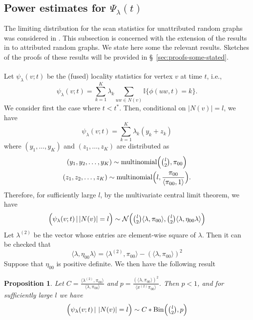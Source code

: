 \documentclass[draftcls]{IEEEtran}
\newtheorem{proposition}[theorem]{Proposition}
\theoremstyle{definition}
\begin{document}
\subsection{Power estimates for $\Psi_{\lambda}(t)$}
The limiting distribution for the scan statistics for unattributed
random graphs was considered in
\cite{rukhin:_limit_distr_graph_scan_statis}. This subsection is
concerned with the extension of the results in
\cite{rukhin:_limit_distr_graph_scan_statis} to attributed random
graphs. We state here some the relevant results. Sketches of the
proofs of these results will be provided in
\S~\ref{sec:proofs-some-stated}. \\ \\
\noindent
Let $\psi_{\lambda}(v;t)$ be the (fused) locality statistics for
vertex $v$ at time $t$, i.e.,
\begin{equation}
  \label{eq:11}
  \psi_{\lambda}(v;t) = \sum_{k=1}^{K} \lambda_k \sum_{uw \in N(v)}
  \mathbb{I}\{\phi(uw,t) = k\}.
\end{equation}
We consider first the case where $t < t^{*}$. Then, conditional on
$|N(v)| = l$, we have
\begin{equation*}
  \psi_{\lambda}(v;t) = \sum_{k=1}^{K}{\lambda_k (y_k + z_k)}
\end{equation*}
where $(y_1, \dots, y_K)$ and $(z_1, \dots, z_K)$ are distributed as
\begin{gather*}
  (y_1,y_2,\dots,y_K) \sim \textrm{multinomial}\Bigl(
  \tbinom{l}{2}, \pi_{00}\Bigr) \\ (z_1, z_2, \dots, z_K) \sim
  \textrm{multinomial}\Bigl(l, \frac{\pi_{00}}{\langle \pi_{00},
    1\rangle}\Bigr). 
\end{gather*}
Therefore, for sufficiently large $l$, by the multivariate central
limit theorem, we have
\begin{equation*}
  \Bigl(\psi_\lambda(v;t) \, \lvert \, |N(v)| = l \Bigr) \sim
  \mathcal{N}\Bigl(\tbinom{l}{2} \langle \lambda, \pi_{00} \rangle,
  \tbinom{l}{2} \langle \lambda, \eta_{00} \lambda \rangle \Bigr)
\end{equation*} 
Let $\lambda^{(2)}$ be the vector whose entries are element-wise
square of $\lambda$. Then it can be checked that 
\begin{equation*}
 \langle \lambda,
\eta_{00} \lambda \rangle = \langle \lambda^{(2)}, \pi_{00} \rangle -
  (\langle \lambda, \pi_{00} \rangle)^2
\end{equation*}
Suppose that $\eta_{00}$ is positive definite. We then have the
following result
\begin{proposition}
  \label{prop:1}
  Let $C = \tfrac{\langle \lambda^{(2)}, \pi_{00} \rangle}{\langle
    \lambda, \pi_{00}\rangle}$ and $p = \tfrac{(\langle \lambda, \pi_{00}
    \rangle)^{2}}{\langle x^{(2)} \pi_{00} \rangle}$. Then $p < 1$,
  and for sufficiently large $l$ we have
\begin{equation}
  \label{eq:17}
 \Bigl(\psi_\lambda(v;t) \,\lvert\,\, |N(v)| = l \Bigr) \sim C *  
 \mathrm{Bin}\Bigl(\tbinom{l}{2}, p\Bigr)
\end{equation} 
\end{proposition}
\end{document}
